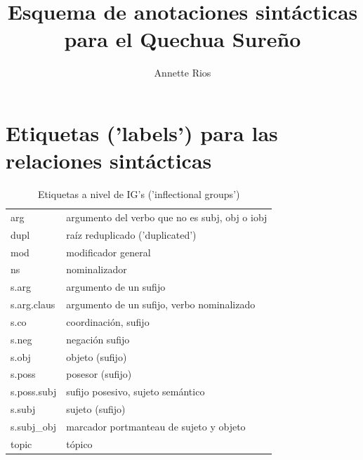 \documentclass[a4paper,11pt,DIV12]{scrartcl}
\title{Esquema de anotaciones sintácticas para el Quechua Sure\~no}
\author{Annette Rios}
\begin{document}
\maketitle
\tableofcontents
\pagebreak
\listoffigures

\listoftables
\pagebreak
\section{Etiquetas ('labels') para las relaciones sint\'acticas}
\begin{table}[h]
 \caption{Etiquetas a nivel de IG's ('inflectional groups')}
\begin{center}
\begin{tabular}{ll}
\toprule 
arg & argumento del verbo que no es subj, obj o iobj\\
dupl & ra\'iz reduplicado ('duplicated')\\
mod & modificador general\\
ns & nominalizador  \\
s.arg & argumento de un sufijo\\
s.arg.claus & argumento de un sufijo, verbo nominalizado\\
s.co & coordinaci\'on, sufijo\\
s.neg & negaci\'on sufijo\\
s.obj & objeto (sufijo)\\
s.poss & posesor (sufijo)\\ 
s.poss.subj & sufijo posesivo, sujeto sem\'antico \\
s.subj & sujeto (sufijo)\\
s.subj\_obj & marcador portmanteau de sujeto y objeto\\
topic & t\'opico\\
\bottomrule
\end{tabular}
\end{center}
\end{table}
\end{document}
